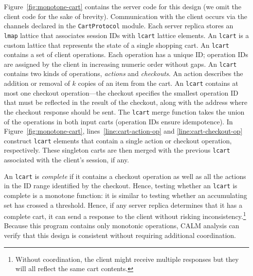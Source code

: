 
Figure~\ref{fig:monotone-cart} contains the server code for this design (we omit
the client code for the sake of brevity). Communication with the client occurs
via the channels declared in the \texttt{CartProtocol} module. Each server
replica stores an \texttt{lmap} lattice that associates session IDs with
\texttt{lcart} lattice elements. An \texttt{lcart} is a custom lattice that
represents the state of a single shopping cart. An \texttt{lcart} contains a set
of client operations. Each operation has a unique ID; operation IDs are assigned
by the client in increasing numeric order without gaps. An \texttt{lcart}
contains two kinds of operations, \emph{actions} and \emph{checkouts}. An action
describes the addition or removal of $k$ copies of an item from the cart. An
\texttt{lcart} contains at most one checkout operation---the checkout specifies
the smallest operation ID that must be reflected in the result of the checkout,
along with the address where the checkout response should be sent. The
\texttt{lcart} merge function takes the union of the operations in both input
carts (operation IDs ensure idempotence). In Figure~\ref{fig:monotone-cart},
lines~\ref{line:cart-action-op} and \ref{line:cart-checkout-op} construct
\texttt{lcart} elements that contain a single action or checkout operation,
respectively. These singleton carts are then merged with the previous
\texttt{lcart} associated with the client's session, if any.

An \texttt{lcart} is \emph{complete} if it contains a checkout operation as well
as all the actions in the ID range identified by the checkout. Hence, testing
whether an \texttt{lcart} is complete is a monotone function: it is similar to
testing whether an accumulating set has crossed a threshold. Hence, if any
server replica determines that it has a complete cart, it can send a response to
the client without risking inconsistency.\footnote{Without coordination, the
  client might receive multiple responses but they will all reflect the same
  cart contents.} Because this program contains only monotonic operations,
CALM analysis can verify that this design is consistent without requiring
additional coordination.


